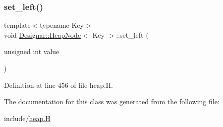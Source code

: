 \subsubsection{\texorpdfstring{set\+\_\+left()}{set\_left()}}
{\footnotesize\ttfamily template$<$typename Key$>$ \\
void \hyperlink{class_designar_1_1_heap_node}{Designar\+::\+Heap\+Node}$<$ Key $>$\+::set\+\_\+left (\begin{DoxyParamCaption}\item[{unsigned int}]{value }\end{DoxyParamCaption})\hspace{0.3cm}{\ttfamily [inline]}}



Definition at line 456 of file heap.\+H.



The documentation for this class was generated from the following file\+:\begin{DoxyCompactItemize}
\item 
include/\hyperlink{heap_8_h}{heap.\+H}\end{DoxyCompactItemize}
